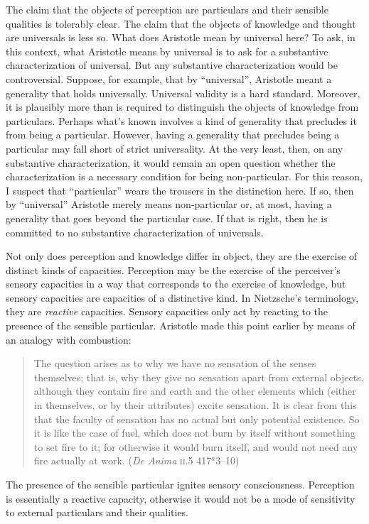 The claim that the objects of perception are particulars and their sensible qualities is tolerably clear. The claim that the objects of knowledge and thought are universals is less so. What does Aristotle mean by universal here? To ask, in this context, what Aristotle means by universal is to ask for a substantive characterization of universal. But any substantive characterization would be controversial. Suppose, for example, that by ``universal'', Aristotle meant a generality that holds universally. Universal validity is a hard standard. Moreover, it is plausibly more than is required to distinguish the objects of knowledge from particulars. Perhaps what's known involves a kind of generality that precludes it from being a particular. However, having a generality that precludes being a particular may fall short of strict universality. At the very least, then, on any substantive characterization, it would remain an open question whether the characterization is a necessary condition for being non-particular. For this reason, I suspect that ``particular'' wears the trousers in the distinction here. If so, then by ``universal'' Aristotle merely means non-particular or, at most, having a generality that goes beyond the particular case. If that is right, then he is committed to no substantive characterization of universals.

Not only does perception and knowledge differ in object, they are the exercise of distinct kinds of capacities. Perception may be the exercise of the perceiver's sensory capacities in a way that corresponds to the exercise of knowledge, but sensory capacities are capacities of a distinctive kind. In Nietzsche's \citeyearpar{Nietzsche1887On-the-Genealog} terminology, they are \emph{reactive} capacities. Sensory capacities only act by reacting to the presence of the sensible particular. Aristotle made this point earlier by means of an analogy with combustion:
\begin{quote}
	The question arises as to why we have no sensation of the senses themselves; that is, why they give no sensation apart from external objects, although they contain fire and earth and the other elements which (either in themselves, or by their attributes) excite sensation. It is clear from this that the faculty of sensation has no actual but only potential existence. So it is like the case of fuel, which does not burn by itself without something to set fire to it; for otherwise it would burn itself, and would not need any fire actually at work. (\emph{De Anima} \textsc{ii}.5 417\( ^{a} \)3--10)
\end{quote}
The presence of the sensible particular ignites sensory consciousness. Perception is essentially a reactive capacity, otherwise it would not be a mode of sensitivity to external particulars and their qualities.

